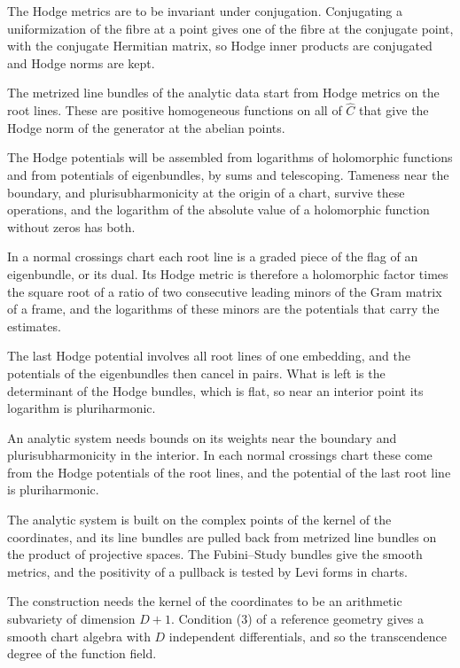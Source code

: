 The Hodge metrics are to be invariant under conjugation. Conjugating a uniformization of the fibre at a point gives one
of the fibre at the conjugate point, with the conjugate Hermitian matrix, so Hodge inner products are conjugated and
Hodge norms are kept.

The metrized line bundles of the analytic data start from Hodge metrics on the root lines. These are positive
homogeneous functions on all of $\hat C$ that give the Hodge norm of the generator at the abelian points.

The Hodge potentials will be assembled from logarithms of holomorphic functions and from potentials of eigenbundles, by
sums and telescoping. Tameness near the boundary, and plurisubharmonicity at the origin of a chart, survive these
operations, and the logarithm of the absolute value of a holomorphic function without zeros has both.

In a normal crossings chart each root line is a graded piece of the flag of an eigenbundle, or its dual. Its Hodge metric
is therefore a holomorphic factor times the square root of a ratio of two consecutive leading minors of the Gram matrix of a
frame, and the logarithms of these minors are the potentials that carry the estimates.

The last Hodge potential involves all root lines of one embedding, and the potentials of the eigenbundles then cancel in
pairs. What is left is the determinant of the Hodge bundles, which is flat, so near an interior point its logarithm is
pluriharmonic.

An analytic system needs bounds on its weights near the boundary and plurisubharmonicity in the interior. In each
normal crossings chart these come from the Hodge potentials of the root lines, and the potential of the last root
line is pluriharmonic.

The analytic system is built on the complex points of the kernel of the coordinates, and its line bundles are
pulled back from metrized line bundles on the product of projective spaces. The Fubini--Study bundles give the smooth
metrics, and the positivity of a pullback is tested by Levi forms in charts.

The construction needs the kernel of the coordinates to be an arithmetic subvariety of dimension $D+1$. Condition
(3) of a reference geometry gives a smooth chart algebra with $D$ independent differentials, and so the
transcendence degree of the function field.

